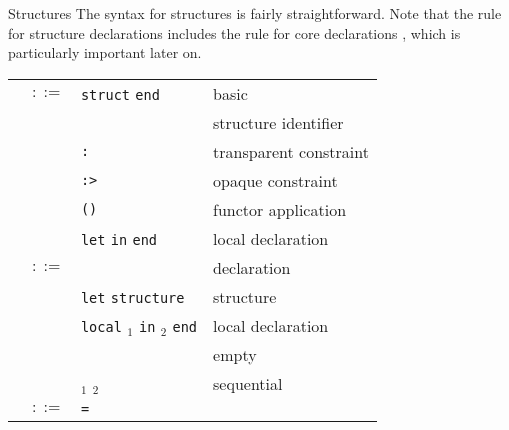 \begin{grammar}{Structures}
  The syntax for structures is fairly straightforward. Note that
  the rule for structure declarations  includes the
  rule for core declarations , which is particularly
  important later on.
\begin{longtable}{rcll}
\label{grammar:strexp}\nonterminal{strexp} & $::=$ & \texttt{struct} \nonterminal{strdec} \texttt{end}
& basic\\
& \alt & \nonterminal{longstrid} & structure identifier\\
&\alt& \nonterminal{strexp} \texttt{:} \hyperref[grammar:sigexp]{\nonterminal{sigexp}} & transparent constraint\\
&\alt& \nonterminal{strexp} \texttt{:>} \hyperref[grammar:sigexp]{\nonterminal{sigexp}} & opaque constraint\\
&\alt& \nonterminal{funid}\texttt{(}\nonterminal{strexp}\texttt{)} & functor application\\
&\alt&\texttt{let} \nonterminal{strdec} \texttt{in} \nonterminal{strexp} \texttt{end} & local declaration\\
\label{grammar:strdec}\nonterminal{strdec} & $::=$ & \hyperref[grammar:dec]{\nonterminal{dec}}
& declaration\\
&\alt&\texttt{let} \texttt{structure} \nonterminal{strbind} & structure\\
&\alt&\texttt{local} \nonterminal{strdec}$_{1}$ \texttt{in} \nonterminal{strdec}$_{2}$ \texttt{end} & local declaration\\
&\alt& & empty\\
&\alt&\nonterminal{strdec}$_{1}$ \optional{\texttt{;}} \nonterminal{strdec}$_{2}$ & sequential\\
\label{grammar:strbind}\nonterminal{strbind} & $::=$ & \nonterminal{strid} \texttt{=} \nonterminal{strexp} \optional{\texttt{and} \nonterminal{strbind}} & \\
\end{longtable}
\end{grammar}

\begin{comment}{Ambiguous grammar for \nonterminal{strdec}}
Rossberg~\cite{rossberg2018defects} notes that the production rule for
sequential structure declarations ``\nonterminal{strdec}$_{1}$ \optional{\texttt{;}} \nonterminal{strdec}$_{2}$''
is ambiguous. Is it left-associative or right-associative?

I'd advocate for making it right recursive, so we could write a simple
recursive descent parser for Standard ML.
\end{comment}

